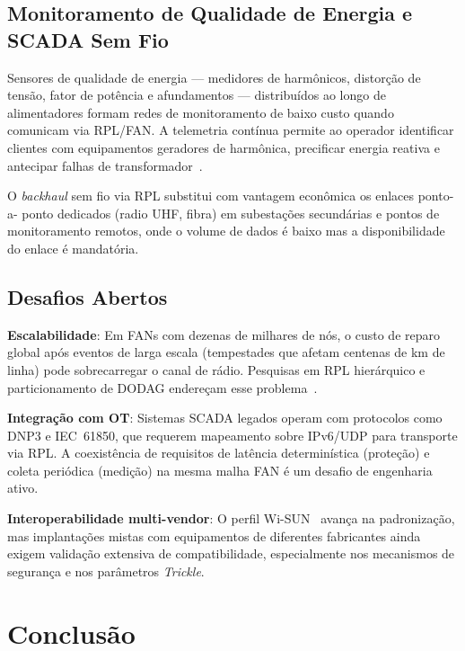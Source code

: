 \documentclass[conference]{IEEEtran}
\begin{document}
\subsection{Monitoramento de Qualidade de Energia e SCADA Sem Fio}

Sensores de qualidade de energia --- medidores de harmônicos, distorção de
tensão, fator de potência e afundamentos --- distribuídos ao longo de
alimentadores formam redes de monitoramento de baixo custo quando comunicam via
RPL/FAN. A telemetria contínua permite ao operador identificar clientes com
equipamentos geradores de harmônica, precificar energia reativa e antecipar
falhas de transformador~\cite{ancillotti2013rpl}.

O \textit{backhaul} sem fio via RPL substitui com vantagem econômica os enlaces ponto-a-
ponto dedicados (radio UHF, fibra) em subestações secundárias e pontos de
monitoramento remotos, onde o volume de dados é baixo mas a disponibilidade
do enlace é mandatória.

\subsection{Desafios Abertos}

\textbf{Escalabilidade}: Em FANs com dezenas de milhares de nós, o custo de
reparo global após eventos de larga escala (tempestades que afetam centenas de
km de linha) pode sobrecarregar o canal de rádio. Pesquisas em RPL hierárquico
e particionamento de DODAG endereçam esse problema~\cite{accettura2011rpl}.

\textbf{Integração com OT}: Sistemas SCADA legados operam com protocolos como
DNP3 e IEC~61850, que requerem mapeamento sobre IPv6/UDP para transporte via
RPL. A coexistência de requisitos de latência determinística (proteção) e
coleta periódica (medição) na mesma malha FAN é um desafio de engenharia ativo.

\textbf{Interoperabilidade multi-vendor}: O perfil Wi-SUN~\cite{wisun2022}
avança na padronização, mas implantações mistas com equipamentos de diferentes
fabricantes ainda exigem validação extensiva de compatibilidade, especialmente
nos mecanismos de segurança e nos parâmetros \textit{Trickle}.

\section{Conclusão}
\label{sec:conclusion}
\end{document}

